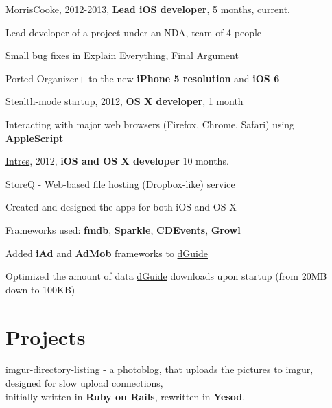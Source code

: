 \documentclass[letterpaper]{article}
\renewenvironment{itemize}{
  \begin{list}{}{
    \setlength{\leftmargin}{1.5em}
  }
}{
  \end{list}
}
\begin{document}
\begin{itemize}
    \item \href{http://www.morriscooke.com}{MorrisCooke}, 2012-2013, {\bf Lead iOS developer}, 5 months, current.
		\begin{itemize}
            \item Lead developer of a project under an NDA, team of 4 people
            \item Small bug fixes in Explain Everything, Final Argument
            \item Ported Organizer+ to the new {\bf iPhone 5 resolution} and {\bf iOS 6}
		\end{itemize}

	\item Stealth-mode startup, 2012, {\bf OS X developer}, 1 month
		\begin{itemize}
			\item Interacting with major web browsers (Firefox, Chrome, Safari) using {\bf AppleScript}
		\end{itemize}

    \item \href{http://intres.com.pl}{Intres}, 2012, {\bf iOS and OS X developer} 10 months.
		\begin{itemize}

            \item \href{http://storeq.com}{StoreQ} - Web-based file hosting (Dropbox-like) service
                \begin{itemize}
                    \item Created and designed the apps for both iOS and OS X
                    \item Frameworks used: {\bf fmdb}, {\bf Sparkle}, {\bf CDEvents}, {\bf Growl}
                \end{itemize}

            \item Added {\bf iAd} and {\bf AdMob} frameworks to \href{http://dguide.pl}{dGuide}

            \item Optimized the amount of data \href{http://dguide.pl}{dGuide} downloads upon startup (from 20MB down to 100KB)

        \end{itemize}

\end{itemize}

\section*{Projects}
\begin{itemize}
    \item imgur-directory-listing - a photoblog, that uploads the pictures to \href{http://imgur.com}{imgur},
        designed for slow upload connections,\\ initially written in {\bf Ruby on Rails}, rewritten in {\bf Yesod}.
\end{itemize}
\end{document}

